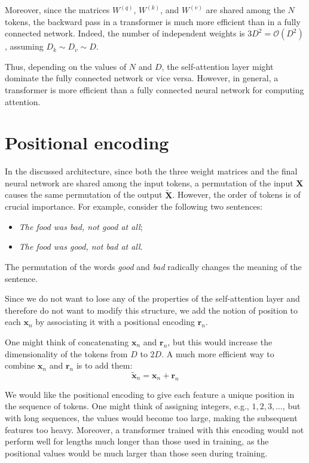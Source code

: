 Moreover, since the matrices $W^{(q)}$, $W^{(k)}$, and $W^{(v)}$ are shared among the $N$ tokens, the backward pass in a transformer is much more efficient than in a fully connected network. Indeed, the number of independent weights is $3 D^2 = \mathcal{O}(D^2)$, assuming $D_k \sim D_v \sim D$.

Thus, depending on the values of $N$ and $D$, the self-attention layer might dominate the fully connected network or vice versa. However, in general, a transformer is more efficient than a fully connected neural network for computing attention.

\section{Positional encoding}
In the discussed architecture, since both the three weight matrices and the final neural network are shared among the input tokens, a permutation of the input $\mathbf{X}$ causes the same permutation of the output $\tilde{\mathbf{X}}$. However, the order of tokens is of crucial importance.
For example, consider the following two sentences:
\begin{itemize}
    \item \textit{The food was bad, not good at all};
    \item \textit{The food was good, not bad at all}.
\end{itemize}

The permutation of the words \textit{good} and \textit{bad} radically changes the meaning of the sentence.

Since we do not want to lose any of the properties of the self-attention layer and therefore do not want to modify this structure, we add the notion of position to each $\mathbf{x}_n$ by associating it with a positional encoding $\mathbf{r}_n$.

One might think of concatenating $\mathbf{x}_n$ and $\mathbf{r}_n$, but this would increase the dimensionality of the tokens from $D$ to $2D$. A much more efficient way to combine $\mathbf{x}_n$ and $\mathbf{r}_n$ is to add them:
\[
\tilde{\mathbf{x}}_{n}=\mathbf{x}_{n}+ \mathbf{r}_{n}
\]

We would like the positional encoding to give each feature a unique position in the sequence of tokens. One might think of assigning integers, e.g., $1, 2, 3, \ldots$, but with long sequences, the values would become too large, making the subsequent features too heavy. Moreover, a transformer trained with this encoding would not perform well for lengths much longer than those used in training, as the positional values would be much larger than those seen during training.

